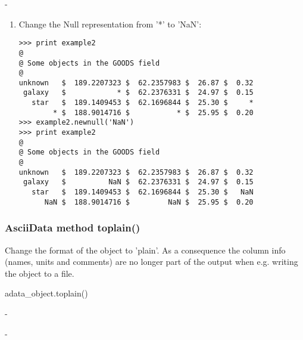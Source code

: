 -

\begin{enumerate}
\item Change the Null representation from '*' to 'NaN':
\begin{small}
\begin{verbatim}
>>> print example2
@
@ Some objects in the GOODS field
@
unknown   $  189.2207323 $  62.2357983 $  26.87 $  0.32
 galaxy   $            * $  62.2376331 $  24.97 $  0.15
   star   $  189.1409453 $  62.1696844 $  25.30 $     *
        * $  188.9014716 $           * $  25.95 $  0.20
>>> example2.newnull('NaN')
>>> print example2
@
@ Some objects in the GOODS field
@
unknown   $  189.2207323 $  62.2357983 $  26.87 $  0.32
 galaxy   $          NaN $  62.2376331 $  24.97 $  0.15
   star   $  189.1409453 $  62.1696844 $  25.30 $   NaN
      NaN $  188.9014716 $         NaN $  25.95 $  0.20
\end{verbatim}
\end{small}
\end{enumerate}


\subsubsection{AsciiData method toplain()}
\label{adm_toplain}

Change the format of the \ad object to 'plain'. As a consequence the column info
(names, units and comments) are no longer part of the output when e.g. writing the
object to a file.

 adata\_object.toplain()

-

-

